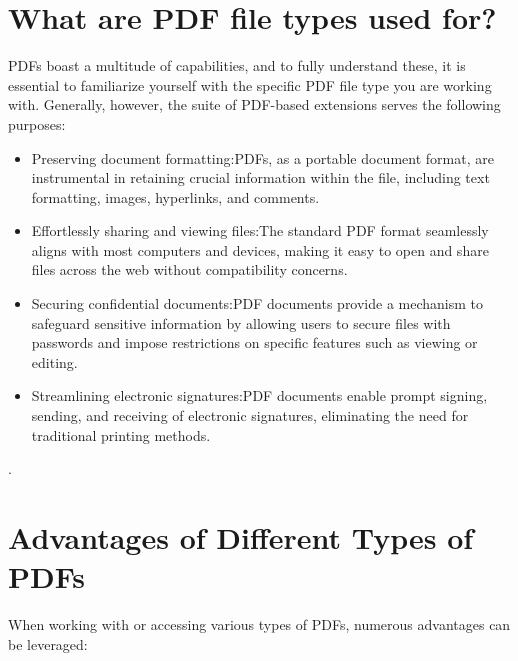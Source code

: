 \bigskip

\section{What are PDF file types used for?}

PDFs boast a multitude of capabilities, and to fully understand these, it is essential to familiarize yourself with the specific PDF file type you are working with. Generally, however, the suite of PDF-based extensions serves the following purposes:

\begin{itemize}
\item Preserving document formatting:PDFs, as a portable document format, are instrumental in retaining crucial information within the file, including text formatting, images, hyperlinks, and comments.

\item Effortlessly sharing and viewing files:The standard PDF format seamlessly aligns with most computers and devices, making it easy to open and share files across the web without compatibility concerns.

\item Securing confidential documents:PDF documents provide a mechanism to safeguard sensitive information by allowing users to secure files with passwords and impose restrictions on specific features such as viewing or editing.

\item Streamlining electronic signatures:PDF documents enable prompt signing, sending, and receiving of electronic signatures, eliminating the need for traditional printing methods.
\end{itemize}

\bigskip
\cite{AdobePDF:2024a}.

\section{Advantages of Different Types of PDFs}

When working with or accessing various types of PDFs, numerous advantages can be leveraged:

